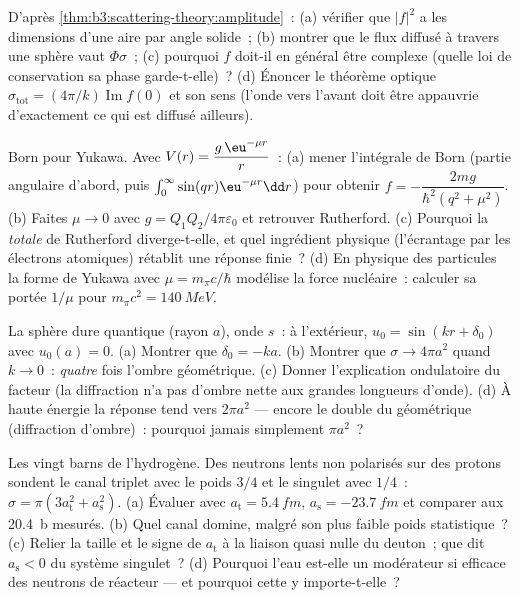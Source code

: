 \begin{exercise}[$\star$]\label{exo:b3:scattering-theory:4}
D'après \cref{thm:b3:scattering-theory:amplitude}~: (a) vérifier que
$|f|^2$ a les dimensions d'une aire par angle solide~; (b) montrer que
le flux diffusé à travers une sphère vaut $\Phi\sigma$~; (c) pourquoi
$f$ doit-il en général être complexe (quelle loi de conservation sa
phase garde-t-elle)~? (d) Énoncer le théorème optique $\sigma_{\text{tot}} =
(4\pi/k)\operatorname{Im}f(0)$ et son sens (l'onde vers l'avant doit
être appauvrie d'exactement ce qui est diffusé ailleurs).
\end{exercise}

\begin{exercise}[$\star\star$]\label{exo:b3:scattering-theory:5}
Born pour Yukawa. Avec $V(r) = \dfrac{g\,\eu^{-\mu r}}{r}$~: (a)
mener l'intégrale de Born (partie angulaire d'abord, puis $\int_0^
\infty\sin(qr)\eu^{-\mu r}\dd r$) pour obtenir $f = -\dfrac{2mg}
{\hbar^2(q^2 + \mu^2)}$. (b) Faites $\mu \to 0$ avec $g =
Q_1Q_2/4\pi\varepsilon_0$ et retrouver Rutherford. (c) Pourquoi la
 \emph{totale} de Rutherford diverge-t-elle, et quel
ingrédient physique (l'écrantage par les électrons atomiques) rétablit
une réponse finie~? (d) En physique des particules la forme de Yukawa
avec $\mu =
m_\pi c/\hbar$ modélise la force nucléaire~: calculer sa portée
$1/\mu$ pour $m_\pi c^2 = \qty{140}{MeV}$.
\end{exercise}

\begin{exercise}[$\star\star$]\label{exo:b3:scattering-theory:6}
La sphère dure quantique (rayon $a$), onde $s$~: à l'extérieur, $u_0 =
\sin(kr + \delta_0)$ avec $u_0(a) = 0$. (a) Montrer que $\delta_0 = -ka$.
(b) Montrer que $\sigma \to 4\pi a^2$ quand $k \to 0$~: \emph{quatre}
fois l'ombre géométrique. (c) Donner l'explication ondulatoire du
facteur (la diffraction n'a pas d'ombre nette aux grandes longueurs
d'onde). (d) À haute énergie la réponse tend vers $2\pi a^2$ ---
encore le double du géométrique (diffraction d'ombre)~: pourquoi
jamais simplement $\pi a^2$~?
\end{exercise}

\begin{exercise}[$\star\star$]\label{exo:b3:scattering-theory:7}
Les vingt barns de l'hydrogène. Des neutrons lents non polarisés sur
des protons sondent le canal triplet avec le poids $3/4$ et le
singulet avec $1/4$~: $\sigma = \pi(3a_{\text{t}}^2 +
a_{\text{s}}^2)$. (a) Évaluer avec $a_{\text{t}} = \qty{5.4}{fm}$,
$a_{\text{s}} = \qty{-23.7}{fm}$ et comparer aux \qty{20.4}{b}
mesurés. (b) Quel canal domine, malgré son plus faible poids
statistique~? (c) Relier la taille et le signe de $a_{\text{t}}$ à la
liaison quasi nulle du deuton~; que dit $a_{\text{s}} < 0$ du système
singulet~? (d) Pourquoi l'eau est-elle un modérateur si efficace des
neutrons de réacteur --- et pourquoi cette  y
importe-t-elle~?
\end{exercise}

